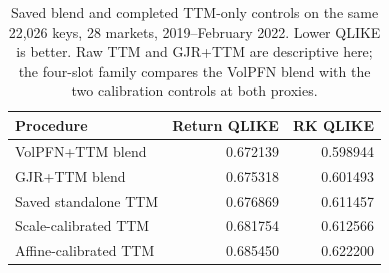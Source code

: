 \begin{table}[!htbp]\centering\small
\caption[TTM-only causal calibration controls]{Saved blend and completed TTM-only controls on the same 22,026 keys, 28 markets, 2019--February 2022. Lower QLIKE is better. Raw TTM and GJR+TTM are descriptive here; the four-slot family compares the VolPFN blend with the two calibration controls at both proxies.}
\label{tab:followup-ttm}
\begin{tabular}{lrr}
\toprule
Procedure & Return QLIKE & RK QLIKE \\
\midrule
VolPFN+TTM blend & 0.672139 & 0.598944 \\
GJR+TTM blend & 0.675318 & 0.601493 \\
Saved standalone TTM & 0.676869 & 0.611457 \\
Scale-calibrated TTM & 0.681754 & 0.612566 \\
Affine-calibrated TTM & 0.685450 & 0.622200 \\
\bottomrule\end{tabular}
\end{table}
